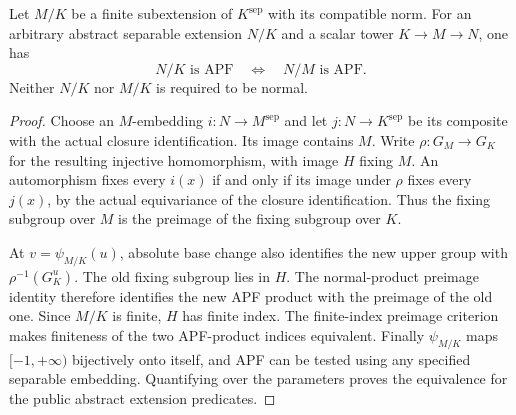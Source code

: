 \begin{proposition}
\label{fw:apf-finite-base}
\leanok
Let $M/K$ be a finite subextension of $K^{\mathrm{sep}}$ with its
compatible norm. For an arbitrary abstract separable extension $N/K$
and a scalar tower $K\to M\to N$, one has
\[
 N/K\text{ is APF}\quad\Longleftrightarrow\quad N/M\text{ is APF}.
\]
Neither $N/K$ nor $M/K$ is required to be normal.
\end{proposition}
\begin{proof}
Choose an $M$-embedding $i:N\to M^{\mathrm{sep}}$ and let $j:N\to
K^{\mathrm{sep}}$ be its composite with the actual closure
identification. Its image contains $M$. Write $\rho:G_M\to G_K$ for
the resulting injective homomorphism, with image $H$ fixing $M$.
An automorphism fixes every $i(x)$ if and only if its image under
$\rho$ fixes every $j(x)$, by the actual equivariance of the closure
identification. Thus the fixing subgroup over $M$ is the preimage of
the fixing subgroup over $K$.

At $v=\psi_{M/K}(u)$, absolute base change also identifies the new upper
group with $\rho^{-1}(G_K^u)$. The old fixing subgroup lies in $H$.
The normal-product preimage identity therefore identifies the new APF
product with the preimage of the old one. Since $M/K$ is finite, $H$
has finite index. The finite-index preimage criterion makes finiteness
of the two APF-product indices equivalent. Finally $\psi_{M/K}$ maps
$[-1,+\infty)$ bijectively onto itself, and APF can be tested using any
specified separable embedding. Quantifying over the parameters proves
the equivalence for the public abstract extension predicates.
\end{proof}

